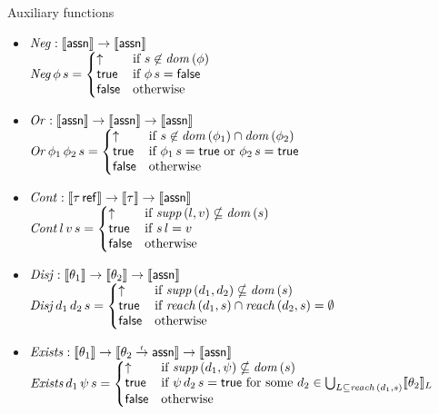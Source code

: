 \documentclass[12pt,a4paper]{report}
\newcommand{\Neg}{\nstyle{Neg}}
\newcommand{\Or}{\nstyle{Or}}
\newcommand{\Cont}{\nstyle{Cont}}
\newcommand{\Disj}{\nstyle{Disj}}
\newcommand{\Exists}{\nstyle{Exists}}
\begin{document}
\noindent Auxiliary functions
\begin{itemize}
  \item $\Neg: \semantic{\tassn} \to \semantic{\tassn}$ \\[1ex]
        $\Neg\,\phi\,s =
          \bcase
            \uparrow  & \text{if } s \not\in \dom{\phi} \\
            \true     & \text{if } \phi\,s=\false \\
            \false    & \text{otherwise}
          \ecase$

  \item $\Or: \semantic{\tassn} \to \semantic{\tassn} \to \semantic{\tassn}$ \\[1ex]
        $\Or\,\phi_1\,\phi_2\,s =
          \bcase
            \uparrow  & \text{if } s \not\in \dom{\phi_1} \cap \dom{\phi_2} \\
            \true     & \text{if } \phi_1\,s=\true \text{ or } \phi_2\,s=\true \\
            \false    & \text{otherwise}
          \ecase$

  \item $\Cont: \semantic{\tref{\tau}} \to \semantic{\tau} \to \semantic{\tassn}$ \\[1ex]
        $\Cont\,l\,v\,s =
          \bcase
            \uparrow  & \text{if } \supp{l,v} \nsubseteq \dom{s} \\
            \true     & \text{if } s\,l = v \\
            \false    & \text{otherwise}
          \ecase$

  \item $\Disj: \semantic{\theta_1} \to \semantic{\theta_2} \to \semantic{\tassn}$ \\[1ex]
        $\Disj\,d_1\,d_2\,s =
          \bcase
            \uparrow  & \text{if } \supp{d_1,d_2} \nsubseteq \dom{s} \\
            \true     & \text{if } \reach{d_1}{s} \cap \reach{d_2}{s} = \emptyset \\
            \false    & \text{otherwise}
          \ecase$
  
  \item $\Exists: \semantic{\theta_1} \to \semantic{\ttarrow{\theta_2}{\tassn}} \to \semantic{\tassn}$ \\[1ex]
        $\Exists\,d_1\,\psi\,s =
          \bcase
            \uparrow  & \text{if } \supp{d_1,\psi} \nsubseteq \dom{s} \\
            \true     & \text{if } \psi\,d_2\,s = \true
                        \text{ for some } d_2 \in \bigcup_{L\subseteq\reach{d_1}{s}}\semantic{\theta_2}_{L} \\
            \false    & \text{otherwise}
          \ecase$
\end{itemize}
\end{document}
